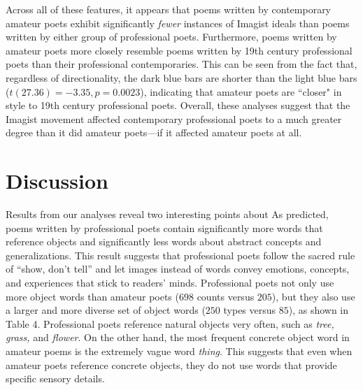 \documentclass{book}
\begin{document}
Across all of these features, it appears that poems written by contemporary amateur poets exhibit significantly \emph{fewer} instances of Imagist ideals than poems written by either group of professional poets. Furthermore, poems written by amateur poets more closely resemble poems written by 19th century professional poets than their professional contemporaries. This can be seen from the fact that, regardless of directionality, the dark blue bars are shorter than the light blue bars ($t(27.36) = -3.35, p = 0.0023$), indicating that amateur poets are ``closer" in style to 19th century professional poets. Overall, these analyses suggest that the Imagist movement affected contemporary professional poets to a much greater degree than it did amateur poets---if it affected amateur poets at all.




\section{Discussion}
Results from our analyses reveal two interesting points about 
As predicted, poems written by professional poets contain significantly more words that reference objects and significantly less words about abstract concepts and generalizations. This result suggests that professional poets follow the sacred rule of ``show, don't tell'' and let images instead of words convey emotions, concepts, and experiences that stick to readers' minds. Professional poets not only use more object words than amateur poets ($698$ counts versus $205$), but they also use a larger and more diverse set of object words ($250$ types versus $85$), as shown in Table 4. Professional poets reference natural objects very often, such as \emph{tree, grass,} and \emph{flower}. On the other hand, the most frequent concrete object word in amateur poems is the extremely vague word \emph{thing}. This suggests that even when amateur poets reference concrete objects, they do not use words that provide specific sensory details.
\end{document}
